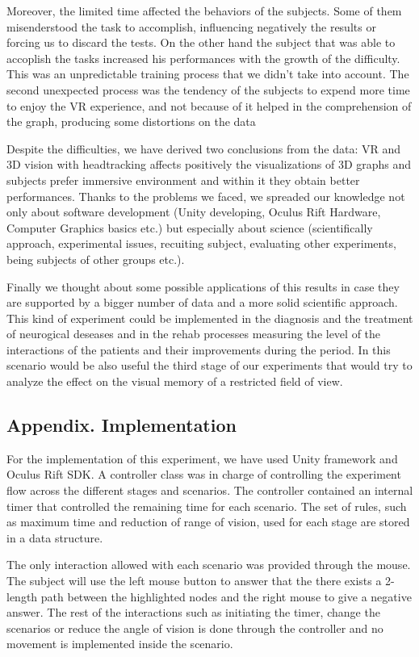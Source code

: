 Moreover, the limited time affected the behaviors of the subjects. Some
of them misenderstood the task to accomplish, influencing negatively the
results or forcing us to discard the tests. On the other hand the
subject that was able to accoplish the tasks increased his performances
with the growth of the difficulty. This was an unpredictable training
process that we didn't take into account. The second unexpected process
was the tendency of the subjects to expend more time to enjoy the VR
experience, and not because of it helped in the comprehension of the
graph, producing some distortions on the data

Despite the difficulties, we have derived two conclusions from the data:
VR and 3D vision with headtracking affects positively the visualizations
of 3D graphs and subjects prefer immersive environment and within it
they obtain better performances. Thanks to the problems we faced, we
spreaded our knowledge not only about software development (Unity
developing, Oculus Rift Hardware, Computer Graphics basics etc.) but
especially about science (scientifically approach, experimental issues,
recuiting subject, evaluating other experiments, being subjects of other
groups etc.).

Finally we thought about some possible applications of this results in
case they are supported by a bigger number of data and a more solid
scientific approach. This kind of experiment could be implemented in the
diagnosis and the treatment of neurogical deseases and in the rehab
processes measuring the level of the interactions of the patients and
their improvements during the period. In this scenario would be also
useful the third stage of our experiments that would try to analyze the
effect on the visual memory of a restricted field of view.

\subsection{Appendix. Implementation}\label{appendix.-implementation}

For the implementation of this experiment, we have used Unity framework
and Oculus Rift SDK. A controller class was in charge of controlling the
experiment flow across the different stages and scenarios. The
controller contained an internal timer that controlled the remaining
time for each scenario. The set of rules, such as maximum time and
reduction of range of vision, used for each stage are stored in a data
structure.

The only interaction allowed with each scenario was provided through the
mouse. The subject will use the left mouse button to answer that the
there exists a 2-length path between the highlighted nodes and the right
mouse to give a negative answer. The rest of the interactions such as
initiating the timer, change the scenarios or reduce the angle of vision
is done through the controller and no movement is implemented inside the
scenario.

